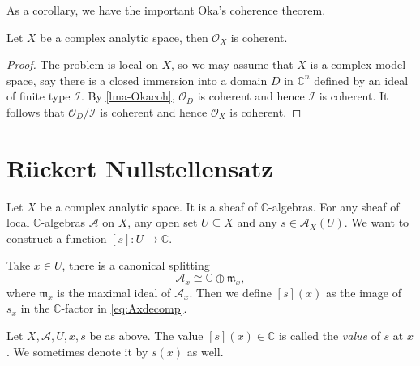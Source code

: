 As a corollary, we have the important Oka's coherence theorem.
\begin{thm}\label{thm-Okacoh}
    Let $X$ be a complex analytic space, then $\mathcal{O}_X$ is coherent.
\end{thm}
\begin{proof}
    The problem is local on $X$, so we may assume that $X$ is a complex model space, say there is a closed immersion into a domain $D$ in $\mathbb{C}^n$ defined by an ideal of finite type $\mathcal{I}$. By \cref{lma-Okacoh}, $\mathcal{O}_D$ is coherent and hence $\mathcal{I}$ is coherent. It follows that $\mathcal{O}_D/\mathcal{I}$ is coherent and hence $\mathcal{O}_X$ is coherent.
\end{proof}



\section{Rückert Nullstellensatz}

Let $X$ be a complex analytic space. It is a sheaf of $\mathbb{C}$-algebras.
For any sheaf of local $\mathbb{C}$-algebras $\mathcal{A}$ on $X$, any open set $U\subseteq X$ and any $s\in \mathcal{A}_X(U)$. We want to construct a function $[s]:U\rightarrow \mathbb{C}$.

Take $x\in U$, there is a canonical splitting
\begin{equation}\label{eq:Axdecomp}
  \mathcal{A}_{x}\cong \mathbb{C}\oplus \mathfrak{m}_{x}, 
\end{equation}
where $\mathfrak{m}_x$ is the maximal ideal of $\mathcal{A}_{x}$. Then we define $[s](x)$ as the image of $s_x$ in the $\mathbb{C}$-factor in \eqref{eq:Axdecomp}.

\begin{definition}\label{def-valuesectionatapoint}
    Let $X,\mathcal{A},U,x,s$ be as above. The value $[s](x)\in \mathbb{C}$ is called the \emph{value} of $s$ at $x$. We sometimes denote it by $s(x)$ as well.
\end{definition}

